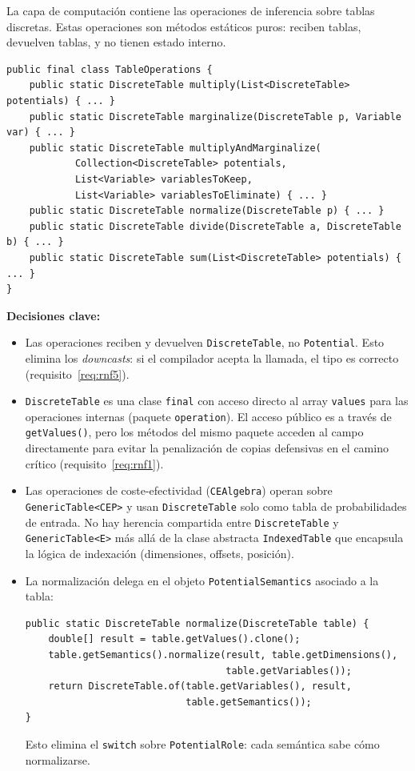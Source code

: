 \documentclass[11pt,a4paper]{article}
\newcommand{\code}[1]{\texttt{#1}}
\begin{document}
La capa de computación contiene las operaciones de inferencia sobre tablas
discretas.  Estas operaciones son métodos estáticos puros: reciben tablas,
devuelven tablas, y no tienen estado interno.

\begin{lstlisting}[caption={Operaciones de inferencia como funciones estáticas}]
public final class TableOperations {
    public static DiscreteTable multiply(List<DiscreteTable> potentials) { ... }
    public static DiscreteTable marginalize(DiscreteTable p, Variable var) { ... }
    public static DiscreteTable multiplyAndMarginalize(
            Collection<DiscreteTable> potentials,
            List<Variable> variablesToKeep,
            List<Variable> variablesToEliminate) { ... }
    public static DiscreteTable normalize(DiscreteTable p) { ... }
    public static DiscreteTable divide(DiscreteTable a, DiscreteTable b) { ... }
    public static DiscreteTable sum(List<DiscreteTable> potentials) { ... }
}
\end{lstlisting}

\noindent \textbf{Decisiones clave:}

\begin{itemize}
  \item Las operaciones reciben y devuelven \code{DiscreteTable}, no
        \code{Potential}.  Esto elimina los \emph{downcasts}: si el compilador
        acepta la llamada, el tipo es correcto (requisito~\ref{req:rnf5}).

  \item \code{DiscreteTable} es una clase \code{final} con acceso directo
        al array \code{values} para las operaciones internas (paquete
        \code{operation}).  El acceso público es a través de \code{getValues()},
        pero los métodos del mismo paquete acceden al campo directamente
        para evitar la penalización de copias defensivas en el camino
        crítico (requisito~\ref{req:rnf1}).

  \item Las operaciones de coste-efectividad (\code{CEAlgebra}) operan
        sobre \code{GenericTable<CEP>} y usan \code{DiscreteTable} solo
        como tabla de probabilidades de entrada.  No hay herencia compartida
        entre \code{DiscreteTable} y \code{GenericTable<E>} más allá de
        la clase abstracta \code{IndexedTable} que encapsula la lógica de
        indexación (dimensiones, offsets, posición).

  \item La normalización delega en el objeto \code{PotentialSemantics}
        asociado a la tabla:
\begin{lstlisting}
public static DiscreteTable normalize(DiscreteTable table) {
    double[] result = table.getValues().clone();
    table.getSemantics().normalize(result, table.getDimensions(),
                                   table.getVariables());
    return DiscreteTable.of(table.getVariables(), result,
                            table.getSemantics());
}
\end{lstlisting}
        Esto elimina el \code{switch} sobre \code{PotentialRole}: cada
        semántica sabe cómo normalizarse.
\end{itemize}
\end{document}
